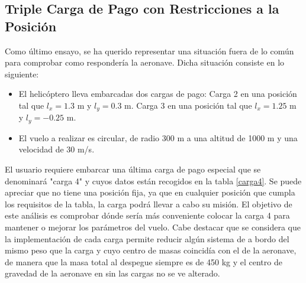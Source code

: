 \subsection*{Triple Carga de Pago con Restricciones a la Posición}

Como último ensayo, se ha querido representar una situación fuera de lo común para comprobar como respondería la aeronave. Dicha situación consiste en lo siguiente:

\begin{itemize}
	\item El helicóptero lleva embarcadas dos cargas de pago:
	\subitem Carga 2 en una posición tal que $l_x=1.3$ m y $l_y=0.3$ m.
	\subitem Carga 3 en una posición tal que $l_x=1.25$ m y $l_y=-0.25$ m.
	\item El vuelo a realizar es circular, de radio 300 m a una altitud de 1000 m y una velocidad de 30 m/s.
\end{itemize}
El usuario requiere embarcar una última carga de pago especial que se denominará "carga 4" y cuyos datos están recogidos en la tabla \ref{carga4}. Se puede apreciar que no tiene una posición fija, ya que en cualquier posición que cumpla los requisitos de la tabla, la carga podrá llevar a cabo su misión.
El objetivo de este análisis es comprobar dónde sería más conveniente colocar la carga 4 para mantener o mejorar los parámetros del vuelo.
Cabe destacar que se considera que la implementación de cada carga permite reducir algún sistema de a bordo del mismo peso que la carga y cuyo centro de masas coincidía con el de la aeronave, de manera que la masa total al despegue siempre es de 450 kg y el centro de gravedad de la aeronave en sin las cargas no se ve alterado.

